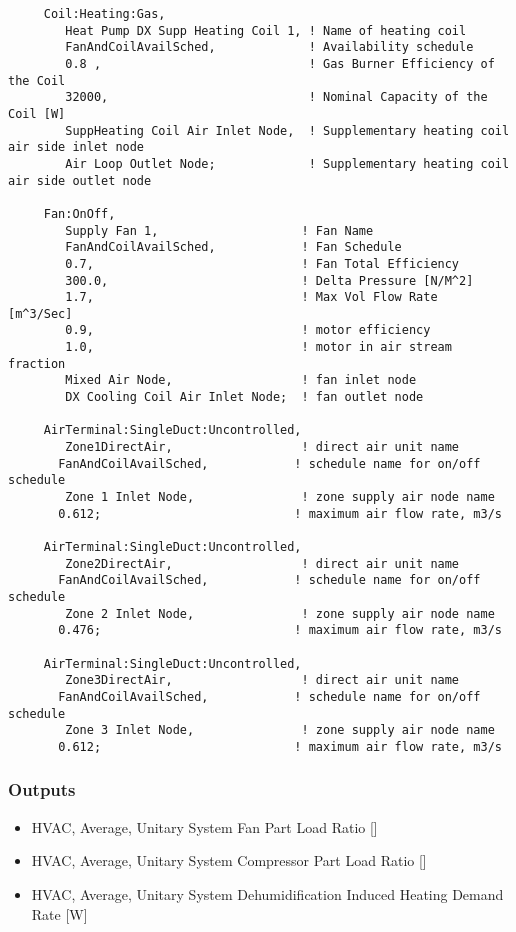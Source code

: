 \begin{lstlisting}
     Coil:Heating:Gas,
        Heat Pump DX Supp Heating Coil 1, ! Name of heating coil
        FanAndCoilAvailSched,             ! Availability schedule
        0.8 ,                             ! Gas Burner Efficiency of the Coil
        32000,                            ! Nominal Capacity of the Coil [W]
        SuppHeating Coil Air Inlet Node,  ! Supplementary heating coil air side inlet node
        Air Loop Outlet Node;             ! Supplementary heating coil air side outlet node

     Fan:OnOff,
        Supply Fan 1,                    ! Fan Name
        FanAndCoilAvailSched,            ! Fan Schedule
        0.7,                             ! Fan Total Efficiency
        300.0,                           ! Delta Pressure [N/M^2]
        1.7,                             ! Max Vol Flow Rate  [m^3/Sec]
        0.9,                             ! motor efficiency
        1.0,                             ! motor in air stream fraction
        Mixed Air Node,                  ! fan inlet node
        DX Cooling Coil Air Inlet Node;  ! fan outlet node

     AirTerminal:SingleDuct:Uncontrolled,
        Zone1DirectAir,                  ! direct air unit name
       FanAndCoilAvailSched,            ! schedule name for on/off schedule
        Zone 1 Inlet Node,               ! zone supply air node name
       0.612;                           ! maximum air flow rate, m3/s

     AirTerminal:SingleDuct:Uncontrolled,
        Zone2DirectAir,                  ! direct air unit name
       FanAndCoilAvailSched,            ! schedule name for on/off schedule
        Zone 2 Inlet Node,               ! zone supply air node name
       0.476;                           ! maximum air flow rate, m3/s

     AirTerminal:SingleDuct:Uncontrolled,
        Zone3DirectAir,                  ! direct air unit name
       FanAndCoilAvailSched,            ! schedule name for on/off schedule
        Zone 3 Inlet Node,               ! zone supply air node name
       0.612;                           ! maximum air flow rate, m3/s
\end{lstlisting}

\subsubsection{Outputs}\label{outputs-2-024}

\begin{itemize}
\item
  HVAC, Average, Unitary System Fan Part Load Ratio {[]}
\item
  HVAC, Average, Unitary System Compressor Part Load Ratio {[]}
\item
  HVAC, Average, Unitary System Dehumidification Induced Heating Demand Rate {[}W{]}
\end{itemize}

